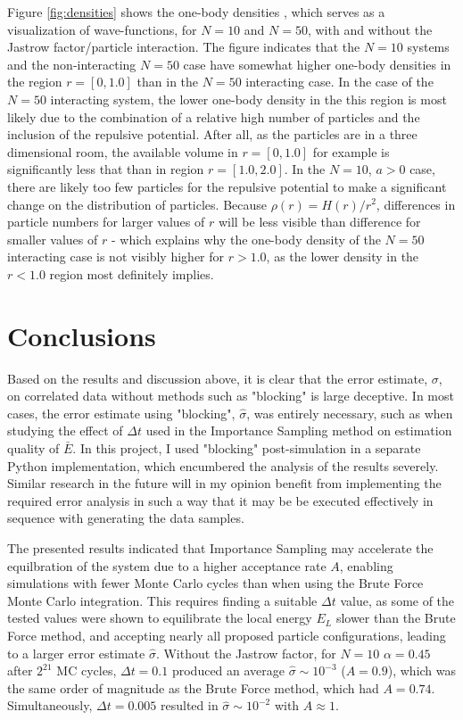 \documentclass[%
oneside,                 %
final,                   %
10pt]{article}
\begin{document}
Figure \ref{fig:densities} shows the one-body densities \cite{Hogberget}, which serves as a visualization of wave-functions, for $N=10$ and $N=50$, with and without the Jastrow factor/particle interaction. The figure indicates that the $N=10$ systems and the non-interacting $N=50$ case have somewhat higher one-body densities in the region $r=[0,1.0]$ than in the $N=50$ interacting case. In the case of the $N=50$ interacting system, the lower one-body density in the this region is most likely due to the combination of a relative high number of particles and the inclusion of the repulsive potential. After all, as the particles are in a three dimensional room, the available volume in $r=[0,1.0]$ for example is significantly less that than in region $r=[1.0,2.0]$. In the $N=10$, $a>0$ case, there are likely too few particles for the repulsive potential to make a significant change on the distribution of particles. Because $\rho(r)=H(r)/r^2$, differences in particle numbers for larger values of $r$ will be less visible than difference for smaller values of $r$ - which explains why the one-body density of the $N=50$ interacting case is not visibly higher for $r>1.0$, as the lower density in the $r<1.0$ region most definitely implies. 

\section{Conclusions} \label{conclusions}
Based on the results and discussion above, it is clear that the error estimate, $\sigma$, on correlated data without methods such as "blocking" is large deceptive. In most cases, the error estimate using "blocking", $\hat \sigma$, was entirely necessary, such as when studying the effect of $\Delta t$ used in the Importance Sampling method on estimation quality of $\bar E$. In this project, I used "blocking" post-simulation in a separate Python implementation, which encumbered the analysis of the results severely. Similar research in the future will in my opinion benefit from implementing the required error analysis in such a way that it may be be executed effectively in sequence with generating the data samples.  

The presented results indicated that Importance Sampling may accelerate the equilbration of the system due to a higher acceptance rate $A$, enabling simulations with fewer Monte Carlo cycles than when using the Brute Force Monte Carlo integration. This requires finding a suitable $\Delta t$ value, as some of the tested values were shown to equilibrate the local energy $E_L$ slower than the Brute Force method, and accepting nearly all proposed particle configurations, leading to a larger error estimate $\hat \sigma$.  Without the Jastrow factor, for $N=10$ $\alpha=0.45$ after $2^{21}$ MC cycles, $\Delta t=0.1$ produced an average $\hat \sigma \sim 10^{-3}$ ($A=0.9$), which was the same order of magnitude as the Brute Force method, which had $A=0.74$. Simultaneously, $\Delta t=0.005$ resulted in $\hat \sigma \sim 10^{-2}$ with $A \approx 1$. 
\end{document}
